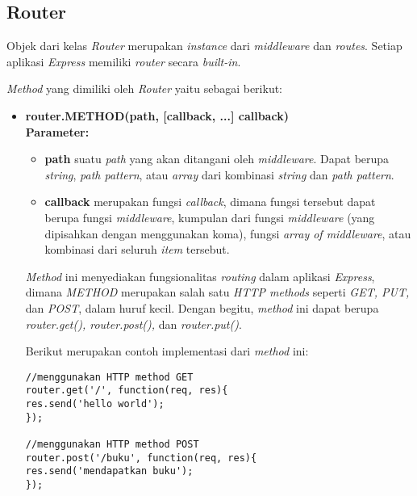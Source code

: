 \subsection{Router}
Objek dari kelas \textit{Router} merupakan \textit{instance} dari \textit{middleware} dan \textit{routes}. Setiap aplikasi \textit{Express} memiliki \textit{router} secara \textit{built-in}. 

\textit{Method} yang dimiliki oleh \textit{Router} yaitu sebagai berikut:

\begin{itemize}
	\item \textbf{router.METHOD(path, [callback, ...] callback)} \\ \textbf{Parameter:} \\ 
	\begin{itemize}
		\item \textbf{path} suatu \textit{path} yang akan ditangani oleh \textit{middleware}. Dapat berupa \textit{string}, \textit{path pattern}, atau \textit{array} dari kombinasi \textit{string} dan \textit{path pattern}.
		
		\item \textbf{callback} merupakan fungsi \textit{callback}, dimana fungsi tersebut dapat berupa fungsi \textit{middleware}, kumpulan dari fungsi \textit{middleware} (yang dipisahkan dengan menggunakan koma), fungsi \textit{array of middleware}, atau kombinasi dari seluruh \textit{item} tersebut.
	\end{itemize}
	
	\textit{Method} ini menyediakan fungsionalitas \textit{routing} dalam aplikasi \textit{Express}, dimana \textit{METHOD} merupakan salah satu \textit{HTTP methods} seperti \textit{GET, PUT, } dan \textit{POST}, dalam huruf kecil. Dengan begitu, \textit{method} ini dapat berupa \textit{router.get(), router.post(),} dan \textit{router.put()}.
	
	Berikut merupakan contoh implementasi dari \textit{method} ini:
\begin{lstlisting}
//menggunakan HTTP method GET
router.get('/', function(req, res){
res.send('hello world');
});
	
//menggunakan HTTP method POST
router.post('/buku', function(req, res){
res.send('mendapatkan buku');
});
\end{lstlisting}
	
\end{itemize}



